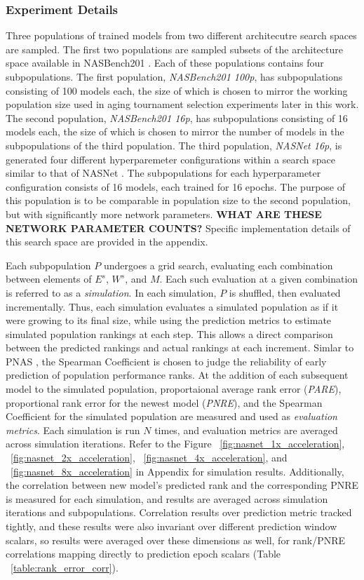 \documentclass[twocolumn]{article}
\begin{document}
\subsubsection{Experiment Details}
Three populations of trained models from two different architecutre search spaces are sampled.
The first two populations are sampled subsets of the architecture space available in NASBench201 \cite{nasbench201}.
Each of these populations contains four subpopulations.
The first population, \emph{NASBench201 100p}, has subpopulations consisting of 100 models each, the size of which is chosen to mirror the working population size 
used in aging tournament selection experiments later in this work.
The second population, \emph{NASBench201 16p}, has subpopulations consisting of 16 models each, the size of which is chosen to mirror the number of models in the 
subpopulations of the third population.
The third population, \emph{NASNet 16p}, is generated four different hyperparemeter configurations within a search space similar to that of NASNet \cite{nasnet}.
The subpopulations for each hyperparameter configuration consists of 16 models, each trained for 16 epochs.
The purpose of this population is to be comparable in population size to the second population, but with significantly more network parameters.
\textbf{WHAT ARE THESE NETWORK PARAMETER COUNTS?}
Specific implementation details of this search space are provided in the appendix.

Each subpopulation $P$ undergoes a grid search, evaluating each combination between elements of $E^s$, $W^s$, and $M$.
Each such evaluation at a given combination is referred to as a \emph{simulation}.
In each simulation, $P$ is shuffled, then evaluated incrementally.
Thus, each simulation evaluates a simulated population as if it were growing to its final size, while using
the prediction metrics to estimate simulated population rankings at each step.
This allows a direct comparison between the predicted rankings and actual rankings at each increment.
Simlar to PNAS \cite{pnas}, the Spearman Coefficient is chosen to judge the reliability of early prediction of population performance ranks.
At the addition of each subsequent model to the simulated population, proportaional average rank error (\emph{PARE}), proportional rank error for the newest model (\emph{PNRE}), and the Spearman Coefficient
for the simulated population are measured and used as \emph{evaluation metrics}.
Each simulation is run $N$ times, and evaluation metrics are averaged across simulation iterations. 
Refer to the Figure ~\ref{fig:nasnet_1x_acceleration}, ~\ref{fig:nasnet_2x_acceleration}, ~\ref{fig:nasnet_4x_acceleration}, and ~\ref{fig:nasnet_8x_acceleration} in Appendix for simulation results.
Additionally, the correlation between new model's predicted rank and the corresponding PNRE is measured for each simulation,
and results are averaged across simulation iterations and subpopulations. 
Correlation results over prediction metric tracked tightly, and these results were also invariant over different prediction window scalars, so results were averaged over
these dimensions as well, for rank/PNRE correlations mapping directly to prediction epoch scalars (Table ~\ref{table:rank_error_corr}).
\end{document}

